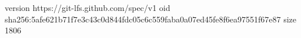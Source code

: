 version https://git-lfs.github.com/spec/v1
oid sha256:5afe621b71f7e3c43c0d844fdc05c6c559faba0a07ed45fe8f6ea97551f67e87
size 1806
